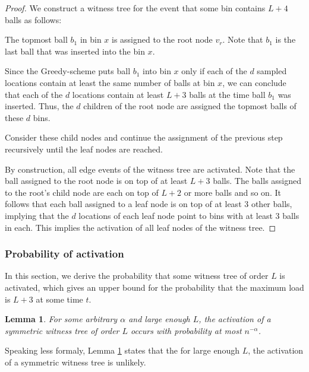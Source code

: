 \documentclass[a4paper,12pt]{article}
\newtheorem{lemma}{Lemma}
\begin{document}
\begin{proof}
We construct a witness tree for the event that some bin contains $L+4$ balls as follows:
\begin{compactenum}
\item The topmost ball $b_1$ in bin $x$ is assigned to the root node $v_r$. Note that $b_1$ is the last ball that was inserted into the bin $x$.
\item Since the Greedy-scheme puts ball $b_1$ into bin $x$ only if each of the $d$ sampled locations contain at least the same number of balls at bin $x$, we can conclude that each of the $d$ locations contain at least $L+3$ balls at the time ball $b_1$ was inserted. Thus, the $d$ children of the root node are assigned the topmost balls of these $d$ bins.
\item Consider these child nodes and continue the assignment of the previous step recursively until the leaf nodes are reached.  
\end{compactenum}

By construction, all edge events of the witness tree are activated. Note that the ball assigned to the root node is on top of at least $L+3$ balls. The balls assigned to the root's child node are each on top of $L+2$ or more balls and so on. It follows that each ball assigned to a leaf node is on top of at least 3 other balls, implying that the $d$ locations of each leaf node point to bins with at least 3 balls in each. This implies the activation of all leaf nodes of the witness tree.
\end{proof}

\subsubsection{Probability of activation}
\label{sec:analysis:probabilitySymWT}
In this section, we derive the probability that some witness tree of order $L$ is activated, which gives an upper bound for the probability that the maximum load is $L+3$ at some time $t$. 

\begin{lemma}\label{lemma:swt:activation}
For some arbitrary $\alpha$ and large enough $L$, the activation of a symmetric witness tree of order $L$ occurs with probability at most $n^{-\alpha}$.
\end{lemma}
Speaking less formaly, Lemma \ref{lemma:swt:activation} states that the for large enough $L$, the activation of a symmetric witness tree is unlikely.
\end{document}

